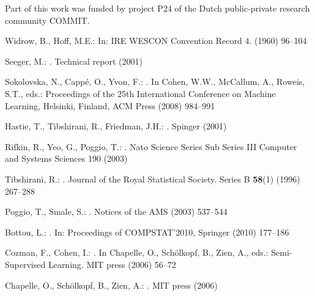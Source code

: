 \documentclass[smallcondensed]{svjour3}
\begin{document}
\begin{acknowledgements}
Part of this work was funded by project P24 of the Dutch public-private research community COMMIT.
\end{acknowledgements}


\begin{thebibliography}{10}

Widrow, B., Hoff, M.E.:
\newblock In: IRE WESCON Convention Record 4. (1960)  96--104

Seeger, M.:
.
\newblock Technical report (2001)

Sokolovska, N., Capp\'{e}, O., Yvon, F.:
.
\newblock In Cohen, W.W., McCallum, A., Roweis, S.T., eds.: Proceedings of the
  25th International Conference on Machine Learning, Helsinki, Finland, ACM
  Press (2008)  984--991

Hastie, T., Tibshirani, R., Friedman, J.H.:
.
\newblock Spinger (2001)

Rifkin, R., Yeo, G., Poggio, T.:
.
\newblock Nato Science Series Sub Series III Computer and Systems Sciences 190
  (2003)

Tibshirani, R.:
.
\newblock Journal of the Royal Statistical Society. Series B \textbf{58}(1)
  (1996)  267--288

Poggio, T., Smale, S.:
.
\newblock Notices of the AMS (2003)  537--544

Bottou, L.:
.
\newblock In: Proceedings of COMPSTAT'2010, Springer (2010)  177--186

Cozman, F., Cohen, I.:
.
\newblock In Chapelle, O., Sch\"{o}lkopf, B., Zien, A., eds.: Semi-Supervised
  Learning.
\newblock MIT press (2006)  56--72

Chapelle, O., Sch\"{o}lkopf, B., Zien, A.:
.
\newblock MIT press (2006)


\end{thebibliography}
\end{document}
